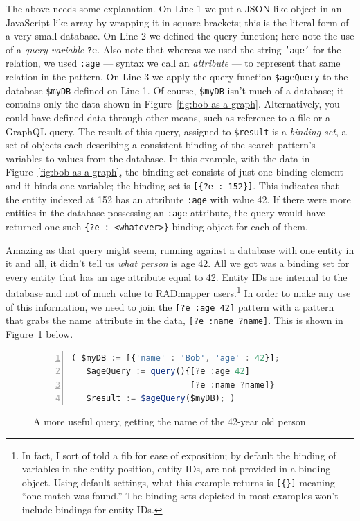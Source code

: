 \documentclass[10pt,letterpaper]{article} %
\newcommand{\stt}[1]{\texttt{#1}} %
\begin{document}
The above needs some explanation.
On Line 1 we put a JSON-like object in an JavaScript-like array by wrapping it in square brackets; this is the literal form of a very small database.
On Line 2 we defined the query function; here note the use of a \textit{query variable} \stt{?e}.
Also note that whereas we used the string \stt{'age'} for the relation, we used \stt{:age} --- syntax we call an \textit{attribute} --- to represent that same relation in the pattern.
On Line 3 we apply the query function \stt{\$ageQuery} to the database \stt{\$myDB} defined on Line 1.
Of course, \stt{\$myDB} isn't much of a database; it contains only the data shown in Figure~\ref{fig:bob-as-a-graph}.
Alternatively, you could have defined data through other means, such as reference to a file or a GraphQL query.
The result of this query, assigned to \stt{\$result} is a \textit{binding set}, a set of objects each describing a consistent binding of the search pattern's variables to values from the database.
In this example, with the data in Figure~\ref{fig:bob-as-a-graph}, the binding set consists of just one binding element and it binds one variable; the binding set is \stt{[\{?e : 152\}]}.
This indicates that the entity indexed at 152 has an attribute \stt{:age} with value 42.
If there were more entities in the database possessing an \stt{:age} attribute, the query would have returned one such \stt{\{?e : <whatever>\}}
binding object for each of them.

Amazing as that query might seem, running against a database with one entity in it and all, it didn't tell us \textit{what person} is age 42.
All we got was a binding set for every entity that has an age attribute equal to 42.
Entity IDs are internal to the database and not of much value to RADmapper users.\footnote{In fact, I sort of told a fib for ease of exposition; by default the binding of variables in the entity position, entity IDs, are not provided in a binding object.
  Using default settings, what this example returns is \stt{[\{\}]} meaning ``one match was found.''
The binding sets depicted in most examples won't include bindings for entity IDs.}
In order to make any use of this information, we need to join the \stt{[?e :age 42]} pattern with a pattern that grabs the name attribute in the data, \stt{[?e :name ?name]}.
This is shown in Figure~\ref{code:bob-age-more} below.

\begin{figure}[H]
    \caption{A more useful query, getting the name of the 42-year old person}
    \label{code:bob-age-more}
\begin{lstlisting}[language=JavaScript,numberstyle=\scriptsize,basicstyle=\ttfamily\scriptsize,numbers=left,stepnumber=1,breaklines=true]
 ( $myDB := [{'name' : 'Bob', 'age' : 42}];
   $ageQuery := query(){[?e :age 42]
                        [?e :name ?name]}
   $result := $ageQuery($myDB); )
\end{lstlisting}
\end{figure} \vspace{-2em}
\end{document}
